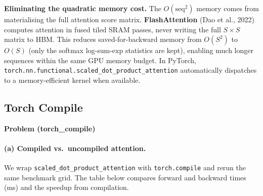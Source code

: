\documentclass[11pt]{article}
\begin{document}
\medskip\noindent\textbf{Eliminating the quadratic memory cost.}
The $O(\text{seq}^2)$ memory comes from materialising the full
attention score matrix.  \textbf{FlashAttention} (Dao et al., 2022)
computes attention in fused tiled SRAM passes, never writing the full
$S\times S$ matrix to HBM.  This reduces saved-for-backward memory from
$O(S^2)$ to $O(S)$ (only the softmax log-sum-exp statistics are kept),
enabling much longer sequences within the same GPU memory budget.
In PyTorch, \texttt{torch.nn.functional.scaled\_dot\_product\_attention}
automatically dispatches to a memory-efficient kernel when available.

\subsection{Torch Compile}
\textbf{Problem (torch\_compile)}

\paragraph{(a) Compiled vs.\ uncompiled attention.}

We wrap \texttt{scaled\_dot\_product\_attention} with
\texttt{torch.compile} and rerun the same benchmark grid.
The table below compares forward and backward times (ms) and
the speedup from compilation.
\end{document}
